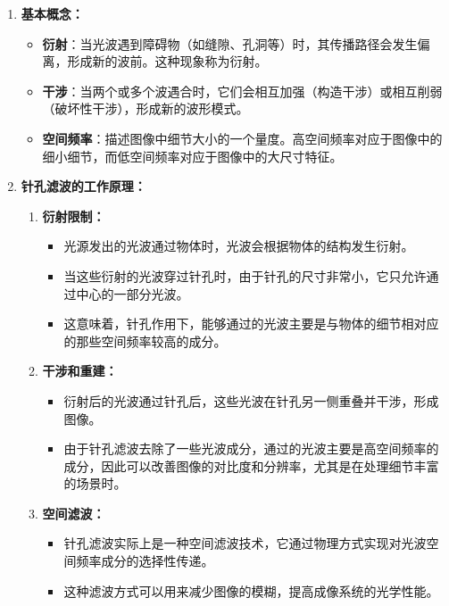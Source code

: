 \documentclass[dvipsnames, svgnames,a4paper,11pt]{article}
\begin{document}
	\begin{enumerate}
		\item \textbf{基本概念：}
		\begin{itemize}
			\item \textbf{衍射}：当光波遇到障碍物（如缝隙、孔洞等）时，其传播路径会发生偏离，形成新的波前。这种现象称为衍射。
			\item \textbf{干涉}：当两个或多个波遇合时，它们会相互加强（构造干涉）或相互削弱（破坏性干涉），形成新的波形模式。
			\item \textbf{空间频率}：描述图像中细节大小的一个量度。高空间频率对应于图像中的细小细节，而低空间频率对应于图像中的大尺寸特征。
		\end{itemize}
		
		\item \textbf{针孔滤波的工作原理：}
		\begin{enumerate}
			\item \textbf{衍射限制：}
			\begin{itemize}
				\item 光源发出的光波通过物体时，光波会根据物体的结构发生衍射。
				\item 当这些衍射的光波穿过针孔时，由于针孔的尺寸非常小，它只允许通过中心的一部分光波。
				\item 这意味着，针孔作用下，能够通过的光波主要是与物体的细节相对应的那些空间频率较高的成分。
			\end{itemize}
			
			\item \textbf{干涉和重建：}
			\begin{itemize}
				\item 衍射后的光波通过针孔后，这些光波在针孔另一侧重叠并干涉，形成图像。
				\item 由于针孔滤波去除了一些光波成分，通过的光波主要是高空间频率的成分，因此可以改善图像的对比度和分辨率，尤其是在处理细节丰富的场景时。
			\end{itemize}
			
			\item \textbf{空间滤波：}
			\begin{itemize}
				\item 针孔滤波实际上是一种空间滤波技术，它通过物理方式实现对光波空间频率成分的选择性传递。
				\item 这种滤波方式可以用来减少图像的模糊，提高成像系统的光学性能。
			\end{itemize}
		\end{enumerate}
	\end{enumerate}
	
\end{document}
